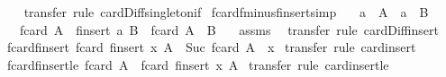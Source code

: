 \begin{isabellebody}
%
\isadelimproof
\ \ %
\endisadelimproof
%
\isatagproof
{}\isamarkupfalse%
\ transfer\ {\isacharparenleft}rule\ card{\isacharunderscore}Diff{\isacharunderscore}singleton{\isacharunderscore}if{\isacharparenright}%
\endisatagproof
{\isafoldproof}%
%
\isadelimproof
\isanewline
%
\endisadelimproof
\isanewline
{}\isamarkupfalse%
\ fcard{\isacharunderscore}fminus{\isacharunderscore}finsert{\isacharbrackleft}simp{\isacharbrackright}{\isacharcolon}\isanewline
\ \ \ {\isachardoublequoteopen}a\ {\isacharbar}{\isasymin}{\isacharbar}\ A{\isachardoublequoteclose}\ \ {\isachardoublequoteopen}a\ {\isacharbar}{\isasymnotin}{\isacharbar}\ B{\isachardoublequoteclose}\isanewline
\ \ \ {\isachardoublequoteopen}fcard\ {\isacharparenleft}A\ {\isacharbar}{\isacharminus}{\isacharbar}\ finsert\ a\ B{\isacharparenright}\ {\isacharequal}\ fcard\ {\isacharparenleft}A\ {\isacharbar}{\isacharminus}{\isacharbar}\ B{\isacharparenright}\ {\isacharminus}\ {}{\isachardoublequoteclose}\isanewline
%
\isadelimproof
%
\endisadelimproof
%
\isatagproof
{}\isamarkupfalse%
\ assms\ \isamarkupfalse%
\ transfer\ {\isacharparenleft}rule\ card{\isacharunderscore}Diff{\isacharunderscore}insert{\isacharparenright}%
\endisatagproof
{\isafoldproof}%
%
\isadelimproof
\isanewline
%
\endisadelimproof
\isanewline
{}\isamarkupfalse%
\ fcard{\isacharunderscore}finsert{\isacharcolon}\ {\isachardoublequoteopen}fcard\ {\isacharparenleft}finsert\ x\ A{\isacharparenright}\ {\isacharequal}\ Suc\ {\isacharparenleft}fcard\ {\isacharparenleft}A\ {\isacharbar}{\isacharminus}{\isacharbar}\ {\isacharbraceleft}{\isacharbar}x{\isacharbar}{\isacharbraceright}{\isacharparenright}{\isacharparenright}{\isachardoublequoteclose}\isanewline
%
\isadelimproof
%
\endisadelimproof
%
\isatagproof
{}\isamarkupfalse%
\ transfer\ {\isacharparenleft}rule\ card{\isacharunderscore}insert{\isacharparenright}%
\endisatagproof
{\isafoldproof}%
%
\isadelimproof
\isanewline
%
\endisadelimproof
\isanewline
{}\isamarkupfalse%
\ fcard{\isacharunderscore}finsert{\isacharunderscore}le{\isacharcolon}\ {\isachardoublequoteopen}fcard\ A\ {\isasymle}\ fcard\ {\isacharparenleft}finsert\ x\ A{\isacharparenright}{\isachardoublequoteclose}\isanewline
%
\isadelimproof
%
\endisadelimproof
%
\isatagproof
{}\isamarkupfalse%
\ transfer\ {\isacharparenleft}rule\ card{\isacharunderscore}insert{\isacharunderscore}le{\isacharparenright}%
\endisatagproof
{\isafoldproof}%
%
\isadelimproof

\end{isabellebody}
